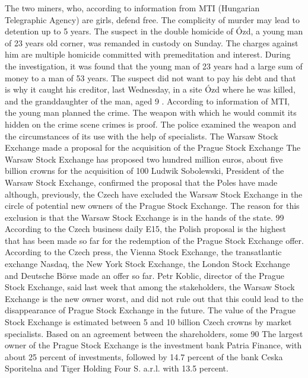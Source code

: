 The two miners, who, according to information from MTI (Hungarian Telegraphic Agency) are girls, defend free.
The complicity of murder may lead to detention up to 5 years.
The suspect in the double homicide of Ózd, a young man of 23 years old corner, was remanded in custody on Sunday.
The charges against him are multiple homicide committed with premeditation and interest.
During the investigation, it was found that the young man of 23 years had a large sum of money to a man of 53 years.
The suspect did not want to pay his debt and that is why it caught his creditor, last Wednesday, in a site Ózd where he was killed, and the granddaughter of the man, aged 9 .
According to information of MTI, the young man planned the crime. The weapon with which he would commit its hidden on the crime scene crimes is proof.
The police examined the weapon and the circumstances of its use with the help of specialists.
The Warsaw Stock Exchange made a proposal for the acquisition of the Prague Stock Exchange
The Warsaw Stock Exchange has proposed two hundred million euros, about five billion crowns for the acquisition of 100%
Ludwik Sobolewski, President of the Warsaw Stock Exchange, confirmed the proposal that the Poles have made although, previously, the Czech have excluded the Warsaw Stock Exchange in the circle of potential new owners of the Prague Stock Exchange.
The reason for this exclusion is that the Warsaw Stock Exchange is in the hands of the state.
99%
According to the Czech business daily E15, the Polish proposal is the highest that has been made so far for the redemption of the Prague Stock Exchange offer.
According to the Czech press, the Vienna Stock Exchange, the transatlantic exchange Nasdaq, the New York Stock Exchange, the London Stock Exchange and Deutsche Börse made an offer so far.
Petr Koblic, director of the Prague Stock Exchange, said last week that among the stakeholders, the Warsaw Stock Exchange is the new owner worst, and did not rule out that this could lead to the disappearance of Prague Stock Exchange in the future.
The value of the Prague Stock Exchange is estimated between 5 and 10 billion Czech crowns by market specialists.
Based on an agreement between the shareholders, some 90%
The largest owner of the Prague Stock Exchange is the investment bank Patria Finance, with about 25 percent of investments, followed by 14.7 percent of the bank Ceska Sporitelna and Tiger Holding Four S. a.r.l. with 13.5 percent.
